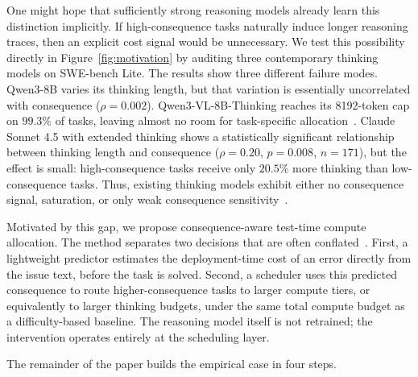 \documentclass{article}
\begin{document}
One might hope that sufficiently strong reasoning models already learn
this distinction implicitly. If high-consequence tasks naturally induce
longer reasoning traces, then an explicit cost signal would be unnecessary. We test this possibility directly in
Figure~\ref{fig:motivation} by auditing three contemporary thinking
models on SWE-bench Lite. The results show three different failure
modes. Qwen3-8B varies its thinking length, but that variation is
essentially uncorrelated with consequence
($\rho = 0.002$). Qwen3-VL-8B-Thinking reaches its 8192-token cap on
$99.3\%$ of tasks, leaving almost no room for task-specific allocation~\citep{pan2025slowthinking}.
Claude Sonnet 4.5 with extended thinking shows a statistically
significant relationship between thinking length and consequence
($\rho = 0.20$, $p = 0.008$, $n = 171$), but the effect is small:
high-consequence tasks receive only $20.5\%$ more thinking than
low-consequence tasks.
Thus, existing thinking models exhibit either no
consequence signal, saturation, or only weak consequence sensitivity~\citep{liu2025efficientreasoning}.

Motivated by this gap, we propose consequence-aware test-time
compute allocation.
The method separates two decisions that are often
conflated~\citep{shirkavand2025costaware}.
First, a lightweight predictor estimates the deployment-time
cost of an error directly from the issue text, before the task is
solved.
Second, a scheduler uses this predicted consequence to route
higher-consequence tasks to larger compute tiers, or equivalently to
larger thinking budgets, under the same total compute budget as a
difficulty-based baseline.
The reasoning model itself is not retrained;
the intervention operates entirely at the scheduling layer.

The remainder of the paper builds the empirical case in four steps.
\end{document}
